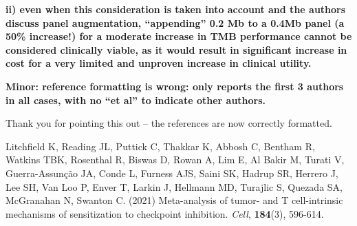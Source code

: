 \documentclass[12pt]{article}
\begin{document}
\textbf{ii) even when this consideration is taken into account and the authors discuss panel augmentation, “appending” 0.2 Mb to a 0.4Mb panel (a 50\% increase!) for a moderate increase in TMB performance cannot be considered clinically viable, as it would result in significant increase in cost for a very limited and unproven increase in clinical utility.}



\textbf{Minor: reference formatting is wrong: only reports the first 3 authors in all cases, with no “et al” to indicate other authors.}

Thank you for pointing this out -- the references are now correctly formatted. 

\begin{thebibliography}{75}
 Litchfield K, Reading JL, Puttick C, Thakkar K, Abbosh C, Bentham R, Watkins TBK, Rosenthal R, Biswas D, Rowan A, Lim E, Al Bakir M, Turati V, Guerra-Assunção JA, Conde L, Furness AJS, Saini SK, Hadrup SR, Herrero J, Lee SH, Van Loo P, Enver T, Larkin J, Hellmann MD, Turajlic S, Quezada SA, McGranahan N, Swanton C. (2021) Meta-analysis of tumor- and T cell-intrinsic mechanisms of sensitization to checkpoint inhibition. \emph{Cell}, \textbf{184}(3), 596-614. 

\end{thebibliography}

\clearpage
\end{document}
